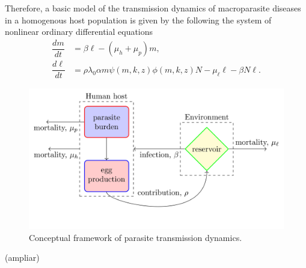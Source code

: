 \documentclass[eng]{MMSB-class-eng}
\begin{document}
{\color{red}

Therefore, a basic model of the transmission dynamics of macroparasite diseases in a homogenous host population is given by the following the system of nonlinear ordinary differential equations 
\begin{equation}\label{model1}
\begin{split}
\dfrac{dm}{dt}&=\beta \ell - (\mu_h+\mu_p)m,\\
\dfrac{d\ell}{dt}&= \rho\lambda_0
\alpha m
\psi(m,k,z) \phi(m,k,z) N- \mu_{\ell} \ell -\beta N \ell.
\end{split}
\end{equation}

\begin{figure}[h!]
	\centering
	\includegraphics[width=0.99\linewidth]{diagram}
	\caption{Conceptual framework of parasite transmission dynamics.}
	\label{f:diagram}
\end{figure}


{\color{blue}(ampliar)}

}
\end{document}
